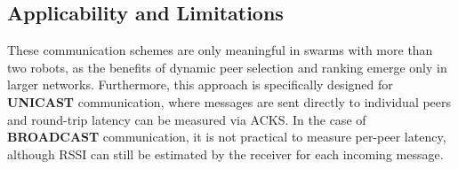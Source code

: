 \documentclass[conference]{IEEEtran}
\begin{document}
\subsection{Applicability and Limitations}

These communication schemes are only meaningful in swarms with more than two robots, as the benefits of dynamic peer selection and ranking emerge only in larger networks. Furthermore, this approach is specifically designed for \textbf{UNICAST} communication, where messages are sent directly to individual peers and round-trip latency can be measured via ACKS. In the case of \textbf{BROADCAST} communication, it is not practical to measure per-peer latency, although RSSI can still be estimated by the receiver for each incoming message.







\newpage
\printbibliography
\end{document}
